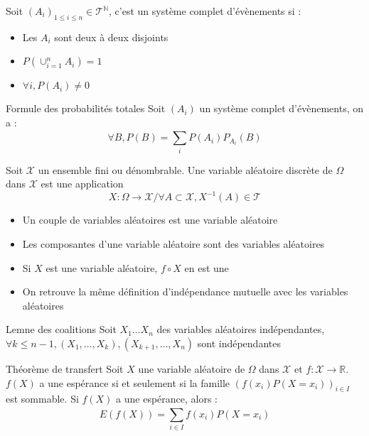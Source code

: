\documentclass[french, a4paper, 10pt, twocolumn]{article}
\newcommand{\N}{\mathbb{N}}   %
\newcommand{\R}{\mathbb{R}}   %
\begin{document}
\begin{definition}
    Soit \((A_i)_{1 \leq i \leq n} \in \mathcal{T}^{\N}\), c'est un système complet d'évènements si :
    \begin{itemize}
        \item Les \(A_i\) sont deux à deux disjoints
        \item \(P(\cup_{i=1}^{n}A_i)=1\)
        \item \(\forall i, P(A_i)\neq 0\)
    \end{itemize}
\end{definition}

\begin{theoreme}{Formule des probabilités totales}
    Soit $(A_i)$ un système complet d'évènements, on a :
        \[\forall B, P(B)=\sum_{i}^{}P(A_i)P_{A_i}(B)\]
\end{theoreme}

\begin{definition}
    Soit \(\mathcal{X}\) un ensemble fini ou dénombrable.
    Une variable aléatoire discrète de \(\Omega\) dans \(\mathcal{X}\) est une application
        \[X : \Omega \rightarrow \mathcal{X} / \forall A \subset \mathcal{X}, X^{-1}(A) \in \mathcal{T}\]
    
    \tcblower
    \begin{itemize}
        \item Un couple de variables aléatoires est une variable aléatoire
        \item Les composantes d'une variable aléatoire sont des variables aléatoires
        \item Si \(X\) est une variable aléatoire, \(f\circ X\) en est une
        \item On retrouve la même définition d'indépendance mutuelle avec les variables aléatoires
    \end{itemize}
\end{definition}

\begin{theoreme}{Lemne des coalitions}
    Soit \(X_1\dots X_n\) des variables aléatoires indépendantes,
    \(\forall k \leq n-1, (X_1,\dots,X_k),(X_{k+1},\dots,X_n)\) sont indépendantes
\end{theoreme}

\begin{theoreme}{Théorème de transfert}
    Soit \(X\) une variable aléatoire de \(\Omega\) dans \(\mathcal{X}\) et \(f : \mathcal{X} \rightarrow \R\).
    \(f(X)\) a une espérance si et seulement si la famille \((f(x_i)P(X=x_i))_{i\in I}\) est sommable.
    Si \(f(X)\) a une espérance, alors : 
        \[E(f(X))=\sum_{i\in I}^{}f(x_i)P(X=x_i)\]
\end{theoreme}
\end{document}
